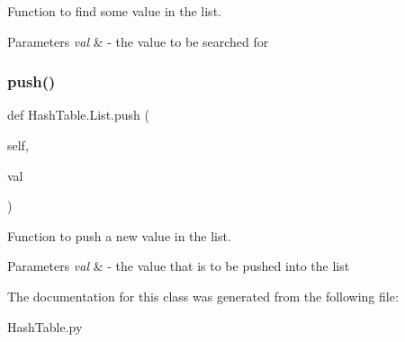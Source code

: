 Function to find some value in the list. 


\begin{DoxyParams}{Parameters}
{\em val} & -\/ the value to be searched for \\
\hline
\end{DoxyParams}
\mbox{\label{class_hash_table_1_1_list_ada3db777d3659dfeff1bdeb93c75f898}} 
\subsubsection{\texorpdfstring{push()}{push()}}
{\footnotesize\ttfamily def Hash\+Table.\+List.\+push (\begin{DoxyParamCaption}\item[{}]{self,  }\item[{}]{val }\end{DoxyParamCaption})}



Function to push a new value in the list. 


\begin{DoxyParams}{Parameters}
{\em val} & -\/ the value that is to be pushed into the list \\
\hline
\end{DoxyParams}


The documentation for this class was generated from the following file\+:\begin{DoxyCompactItemize}
\item 
Hash\+Table.\+py\end{DoxyCompactItemize}
